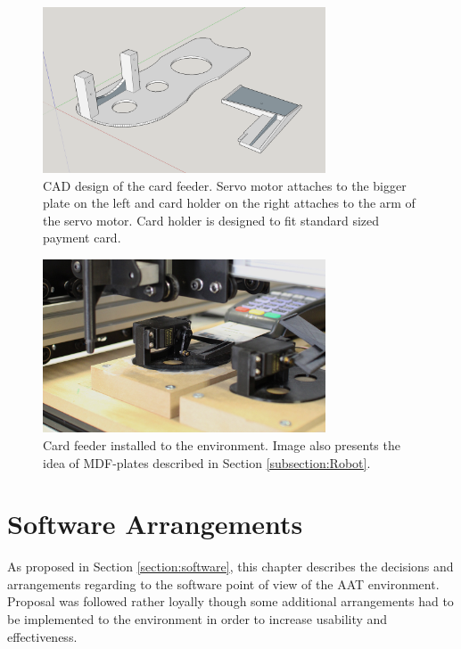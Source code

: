 \begin{figure}[ht]
  \begin{center}
    \includegraphics[width=8.4cm]{images/card_feeder.png}
    \caption{CAD design of the card feeder. Servo motor attaches to the bigger plate on the left and card holder on the right attaches to the arm of the servo motor. Card holder is designed to fit standard sized payment card.}
    \label{fig:card_feeder}
  \end{center}
\end{figure}

\begin{figure}[ht]
  \begin{center}
    \includegraphics[width=8.4cm]{images/card_feeder_2.jpg}
    \caption{Card feeder installed to the environment. Image also presents the idea of MDF-plates described in Section \ref{subsection:Robot}.}
    \label{fig:card_feeder_2}
  \end{center}
\end{figure}
\FloatBarrier

\section{Software Arrangements}
\label{section:Software arrangements}

As proposed in Section \ref{section:software}, this chapter describes the decisions and arrangements regarding to the software point of view of the AAT environment. Proposal was followed rather loyally though some additional arrangements had to be implemented to the environment in order to increase usability and effectiveness.

